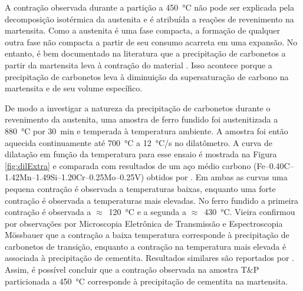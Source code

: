 A contração observada durante a partição a \SI{450}{\degreeCelsius} não pode ser explicada pela decomposição isotérmica da austenita e é atribuída a reações de revenimento na martensita. Como a austenita é uma fase compacta, a formação de qualquer outra fase não compacta a partir de seu consumo acarreta em uma expansão. No entanto, é bem documentado na literatura que a precipitação de carbonetos a partir da martensita leva à contração do material \cite{Vieira2017,Waterschoot2006}. Isso acontece porque a precipitação de carbonetos leva à diminuição da supersaturação de carbono na martensita e de seu volume específico.

De modo a investigar a natureza da precipitação de carbonetos durante o revenimento da austenita, uma amostra de ferro fundido foi austenitizada a \SI{880}{\degreeCelsius} por 30~min e temperada à temperatura ambiente. A amostra foi então aquecida continuamente até \SI{700}{\degreeCelsius} a \SI{12}{\degreeCelsius/s} no dilatômetro. A curva de dilatação em função da temperatura para esse ensaio é mostrada na Figura \ref{fig:dilExtra} e comparada com resultados de um aço médio carbono (Fe--0.40C--1.42Mn--1.49Si--1.20Cr--0.25Mo--0.25V) obtidos por . Em ambas as curvas uma pequena contração é observada a temperaturas baixas, enquanto uma forte contração é observada a temperaturas mais elevadas. No ferro fundido a primeira contração é observada a $\approx$~\SI{120}{\degreeCelsius} e a segunda a $\approx$~\SI{430}{\degreeCelsius}. Vieira confirmou por observações por Microscopia Eletrônica de Transmissão e Espectroscopia Mössbauer que a contração a baixa temperatura corresponde à precipitação de carbonetos de transição, enquanto a contração na temperatura mais elevada é associada à precipitação de cementita. Resultados similares são reportados por .
Assim, é possível concluir que a contração observada na amostra T\&P particionada a \SI{450}{\degreeCelsius} corresponde à precipitação de cementita na martensita.

